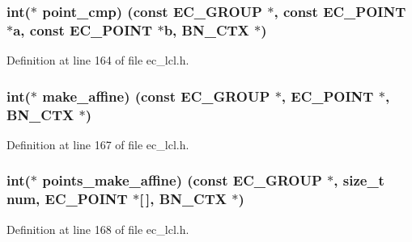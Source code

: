 \subsubsection[{\texorpdfstring{point\+\_\+cmp}{point_cmp}}]{\setlength{\rightskip}{0pt plus 5cm}int($\ast$ point\+\_\+cmp) (const {\bf E\+C\+\_\+\+G\+R\+O\+UP} $\ast$, const {\bf E\+C\+\_\+\+P\+O\+I\+NT} $\ast${\bf a}, const {\bf E\+C\+\_\+\+P\+O\+I\+NT} $\ast$b, {\bf B\+N\+\_\+\+C\+TX} $\ast$)}\hypertarget{structec__method__st_a0f881650f8156ba292c46427287df274}{}\label{structec__method__st_a0f881650f8156ba292c46427287df274}


Definition at line 164 of file ec\+\_\+lcl.\+h.

\subsubsection[{\texorpdfstring{make\+\_\+affine}{make_affine}}]{\setlength{\rightskip}{0pt plus 5cm}int($\ast$ make\+\_\+affine) (const {\bf E\+C\+\_\+\+G\+R\+O\+UP} $\ast$, {\bf E\+C\+\_\+\+P\+O\+I\+NT} $\ast$, {\bf B\+N\+\_\+\+C\+TX} $\ast$)}\hypertarget{structec__method__st_a35c3ae8c8f5f115a2ac2f4c87e322ca1}{}\label{structec__method__st_a35c3ae8c8f5f115a2ac2f4c87e322ca1}


Definition at line 167 of file ec\+\_\+lcl.\+h.

\subsubsection[{\texorpdfstring{points\+\_\+make\+\_\+affine}{points_make_affine}}]{\setlength{\rightskip}{0pt plus 5cm}int($\ast$ points\+\_\+make\+\_\+affine) (const {\bf E\+C\+\_\+\+G\+R\+O\+UP} $\ast$, size\+\_\+t {\bf num}, {\bf E\+C\+\_\+\+P\+O\+I\+NT} $\ast$\mbox{[}$\,$\mbox{]}, {\bf B\+N\+\_\+\+C\+TX} $\ast$)}\hypertarget{structec__method__st_a85ad6e019ec550de3b409078a646e4ac}{}\label{structec__method__st_a85ad6e019ec550de3b409078a646e4ac}


Definition at line 168 of file ec\+\_\+lcl.\+h.

